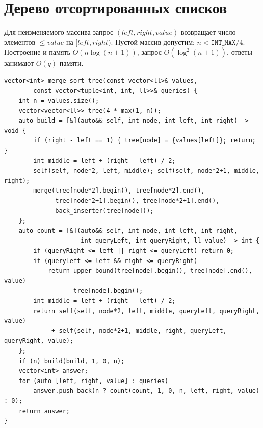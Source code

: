 %

\iffalse
\section{Дерево отсортированных списков}
Для неизменяемого массива запрос $(left,right,value)$ возвращает число элементов $\le value$ на $[left,right)$.
Пустой массив допустим; $n<\texttt{INT\_MAX}/4$.
Построение и память $O(n\log(n+1))$, запрос $O(\log^2(n+1))$, ответы занимают $O(q)$ памяти.
\begin{lstlisting}[name=merge_sort_tree]
vector<int> merge_sort_tree(const vector<ll>& values,
        const vector<tuple<int, int, ll>>& queries) {
    int n = values.size();
    vector<vector<ll>> tree(4 * max(1, n));
    auto build = [&](auto&& self, int node, int left, int right) -> void {
        if (right - left == 1) { tree[node] = {values[left]}; return; }
        int middle = left + (right - left) / 2;
        self(self, node*2, left, middle); self(self, node*2+1, middle, right);
        merge(tree[node*2].begin(), tree[node*2].end(),
              tree[node*2+1].begin(), tree[node*2+1].end(),
              back_inserter(tree[node]));
    };
    auto count = [&](auto&& self, int node, int left, int right,
                     int queryLeft, int queryRight, ll value) -> int {
        if (queryRight <= left || right <= queryLeft) return 0;
        if (queryLeft <= left && right <= queryRight)
            return upper_bound(tree[node].begin(), tree[node].end(), value)
                 - tree[node].begin();
        int middle = left + (right - left) / 2;
        return self(self, node*2, left, middle, queryLeft, queryRight, value)
             + self(self, node*2+1, middle, right, queryLeft, queryRight, value);
    };
    if (n) build(build, 1, 0, n);
    vector<int> answer;
    for (auto [left, right, value] : queries)
        answer.push_back(n ? count(count, 1, 0, n, left, right, value) : 0);
    return answer;
}
\end{lstlisting}
%


